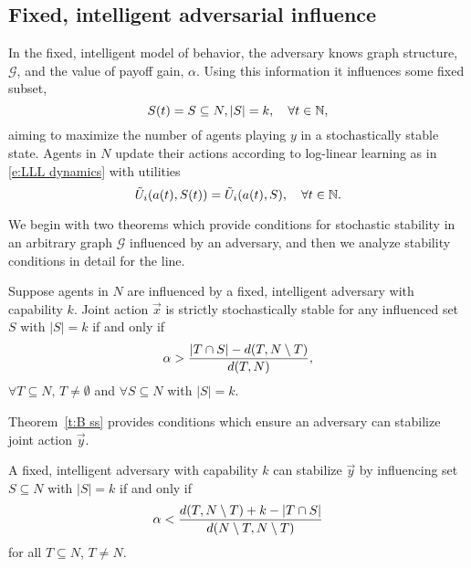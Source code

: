 \subsection{Fixed, intelligent adversarial influence}

In the fixed, intelligent model of behavior, the adversary knows graph structure, $\mathcal{G}$, and the value of payoff gain, $\alpha.$ Using this information it influences some fixed subset, 
$$S(t) = S\subseteq N, |S| = k,\quad \forall t\in\mathbb{N},$$
aiming to maximize the number of agents playing $y$ in a stochastically stable state. Agents in $N$ update their actions according to log-linear learning as in \eqref{e:LLL dynamics} with utilities $$\tilde{U}_i(a(t),S(t)) = \tilde{U}_i(a(t),S),\quad\forall t\in\mathbb{N}.$$ 

We begin with two theorems which provide conditions for stochastic stability in an arbitrary graph $\mathcal{G}$ influenced by an adversary, and then we analyze stability conditions in detail for the line.

\begin{Theorem}\label{t:A stable fixed}
Suppose agents in $N$ are influenced by a fixed, intelligent adversary with capability $k$. Joint action $\vec{x}$ is strictly stochastically stable for any influenced set $S$ with $|S| = k$ if and only if
\begin{equation}
\alpha > {|T\cap S| - d(T,N\setminus T)\over d(T,N)},%
\end{equation}
$\forall T\subseteq N,\,T\neq\emptyset$ and $\forall S\subseteq N$ with $|S| = k$.
\end{Theorem}

Theorem~\ref{t:B ss} provides conditions which ensure an adversary can stabilize joint action $\vec{y}$.%
\begin{Theorem}\label{t:B ss}
A fixed, intelligent  adversary with capability $k$ can stabilize $\vec{y}$ by influencing set $S\subseteq N$ with $|S|=k$ if and only if
\begin{equation}\label{e:above}
\alpha < {d(T,N\setminus T) + k - |T\cap S|\over d(N\setminus T,N\setminus T)}
\end{equation}
for all $T\subseteq N$, $T\neq N$.
\end{Theorem}

